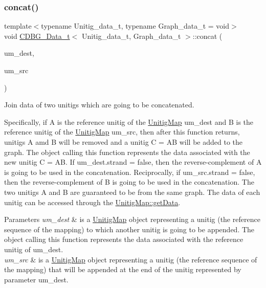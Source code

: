 \subsubsection{\texorpdfstring{concat()}{concat()}}
{\footnotesize\ttfamily template$<$typename Unitig\+\_\+data\+\_\+t, typename Graph\+\_\+data\+\_\+t = void$>$ \\
void \hyperlink{classCDBG__Data__t}{C\+D\+B\+G\+\_\+\+Data\+\_\+t}$<$ Unitig\+\_\+data\+\_\+t, Graph\+\_\+data\+\_\+t $>$\+::concat (\begin{DoxyParamCaption}\item[{const \hyperlink{classUnitigMap}{Unitig\+Map}$<$ Unitig\+\_\+data\+\_\+t, Graph\+\_\+data\+\_\+t $>$ \&}]{um\+\_\+dest,  }\item[{const \hyperlink{classUnitigMap}{Unitig\+Map}$<$ Unitig\+\_\+data\+\_\+t, Graph\+\_\+data\+\_\+t $>$ \&}]{um\+\_\+src }\end{DoxyParamCaption})\hspace{0.3cm}{\ttfamily [inline]}}



Join data of two unitigs which are going to be concatenated. 

Specifically, if A is the reference unitig of the \hyperlink{classUnitigMap}{Unitig\+Map} um\+\_\+dest and B is the reference unitig of the \hyperlink{classUnitigMap}{Unitig\+Map} um\+\_\+src, then after this function returns, unitigs A amd B will be removed and a unitig C = AB will be added to the graph. The object calling this function represents the data associated with the new unitig C = AB. If um\+\_\+dest.\+strand = false, then the reverse-\/complement of A is going to be used in the concatenation. Reciprocally, if um\+\_\+src.\+strand = false, then the reverse-\/complement of B is going to be used in the concatenation. The two unitigs A and B are guaranteed to be from the same graph. The data of each unitig can be accessed through the \hyperlink{classUnitigMap_a0c40fd1ba2df6af9a0c55b7963e41493}{Unitig\+Map\+::get\+Data}. 
\begin{DoxyParams}{Parameters}
{\em um\+\_\+dest} & is a \hyperlink{classUnitigMap}{Unitig\+Map} object representing a unitig (the reference sequence of the mapping) to which another unitig is going to be appended. The object calling this function represents the data associated with the reference unitig of um\+\_\+dest. \\
\hline
{\em um\+\_\+src} & is a \hyperlink{classUnitigMap}{Unitig\+Map} object representing a unitig (the reference sequence of the mapping) that will be appended at the end of the unitig represented by parameter um\+\_\+dest. \\
\hline
\end{DoxyParams}
\mbox{\label{classCDBG__Data__t_a2e78ea1698f48c521164b8294435f618}} 

